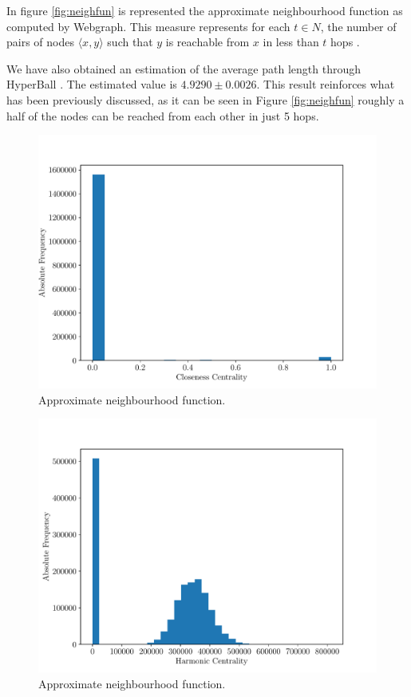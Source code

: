 \documentclass[9pt,a4paper,twocolumn]{article}
\begin{document}
In figure \ref{fig:neighfun} is represented the approximate neighbourhood function as computed by Webgraph. This measure represents for each $t \in N$, the number of pairs of nodes $ \langle x, y \rangle $ such that $y$ is reachable from $x$ in less than $t$ hops \cite{Boldi2011HyperANFAT}.

We have also obtained an estimation of the average path length through HyperBall \cite{DBLP:conf/icdm/BoldiV13}. The estimated value is $ 4.9290 \pm 0.0026 $. This result reinforces what has been previously discussed, as it can be seen in Figure \ref{fig:neighfun} roughly a half of the nodes can be reached from each other in just 5 hops.

\begin{figure}[h]
	\centering
	\includegraphics[width=\linewidth]{wikipedia_pt_closeness_centrality.pdf}
	\caption{Approximate neighbourhood function.}
	\label{fig:closeness}
\end{figure}

\begin{figure}[h]
	\centering
	\includegraphics[width=\linewidth]{wikipedia_pt_harmonic_centrality.pdf}
	\caption{Approximate neighbourhood function.}
	\label{fig:harmonic}
\end{figure}
\end{document}
